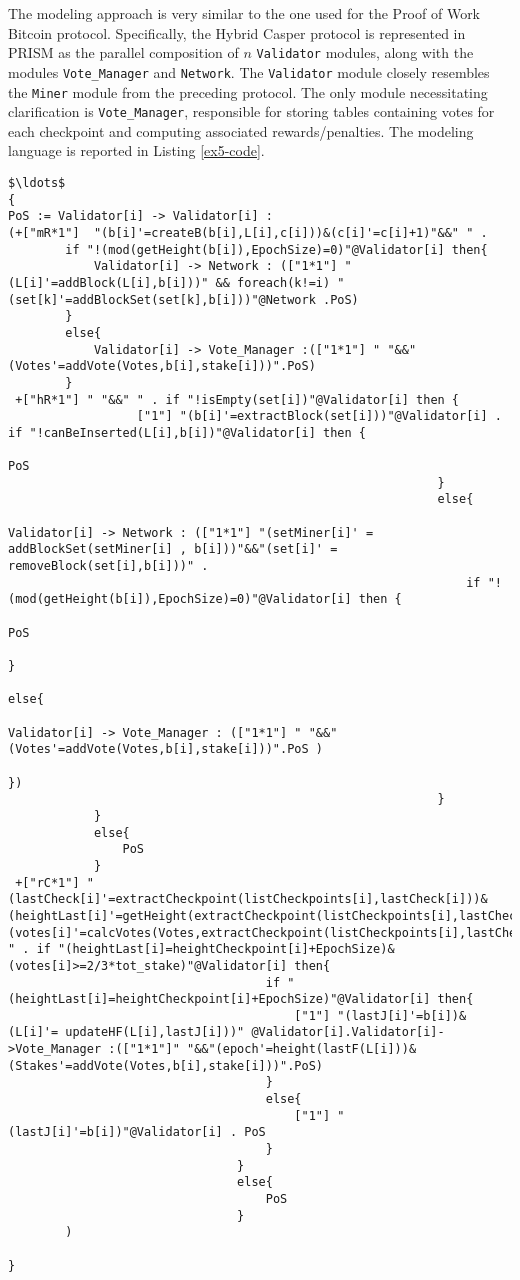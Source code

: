 The modeling approach is very similar to the one used for the Proof of Work Bitcoin protocol. Specifically, the Hybrid Casper protocol is represented in PRISM as the parallel composition of $n$ \texttt{Validator} modules, along with the modules \texttt{Vote\_Manager} and \texttt{Network}. The \texttt{Validator} module closely resembles the \texttt{Miner} module from the preceding protocol. The only module necessitating clarification is \texttt{Vote\_Manager}, responsible for storing tables containing votes for each checkpoint and computing associated rewards/penalties.
The modeling language is reported in Listing \ref{ex5-code}.
\begin{lstlisting}[style=chor-color,tabsize=2,breaklines=true, postbreak=\mbox{\textcolor{red}{$\hookrightarrow$}\space},	caption={Choreographic language for the Hybrid Casper Protocol.},captionpos=b,label={ex5-code}]
$\ldots$
{
PoS := Validator[i] -> Validator[i] :
(+["mR*1"]  "(b[i]'=createB(b[i],L[i],c[i]))&(c[i]'=c[i]+1)"&&" " .
		if "!(mod(getHeight(b[i]),EpochSize)=0)"@Validator[i] then{
			Validator[i] -> Network : (["1*1"] "(L[i]'=addBlock(L[i],b[i]))" && foreach(k!=i) "(set[k]'=addBlockSet(set[k],b[i]))"@Network .PoS)
		}
		else{
			Validator[i] -> Vote_Manager :(["1*1"] " "&&"(Votes'=addVote(Votes,b[i],stake[i]))".PoS)
		}
 +["hR*1"] " "&&" " . if "!isEmpty(set[i])"@Validator[i] then {
 				  ["1"] "(b[i]'=extractBlock(set[i]))"@Validator[i] . if "!canBeInserted(L[i],b[i])"@Validator[i] then {
 				  															PoS
 				  											}
 				  											else{
 				  												Validator[i] -> Network : (["1*1"] "(setMiner[i]' = addBlockSet(setMiner[i] , b[i]))"&&"(set[i]' = removeBlock(set[i],b[i]))" . 
 				  												if "!(mod(getHeight(b[i]),EpochSize)=0)"@Validator[i] then {
 				  																 PoS
 				  														}
 				  														else{
 				  	 															Validator[i] -> Vote_Manager : (["1*1"] " "&&"(Votes'=addVote(Votes,b[i],stake[i]))".PoS )
 				  														})
 				  											}
 			}
 			else{
 				PoS
 			}
 +["rC*1"] "(lastCheck[i]'=extractCheckpoint(listCheckpoints[i],lastCheck[i]))&(heightLast[i]'=getHeight(extractCheckpoint(listCheckpoints[i],lastCheck[i])))&(votes[i]'=calcVotes(Votes,extractCheckpoint(listCheckpoints[i],lastCheck[i])))"&&" " . if "(heightLast[i]=heightCheckpoint[i]+EpochSize)&(votes[i]>=2/3*tot_stake)"@Validator[i] then{
 									if "(heightLast[i]=heightCheckpoint[i]+EpochSize)"@Validator[i] then{
 										["1"] "(lastJ[i]'=b[i])&(L[i]'= updateHF(L[i],lastJ[i]))" @Validator[i].Validator[i]->Vote_Manager :(["1*1"]" "&&"(epoch'=height(lastF(L[i]))&(Stakes'=addVote(Votes,b[i],stake[i]))".PoS)
 									}
 									else{
 										["1"] "(lastJ[i]'=b[i])"@Validator[i] . PoS
 									}
 								}
 								else{
 									PoS
 								}
 		)
 								
}

\end{lstlisting}

